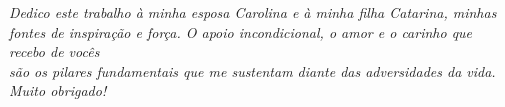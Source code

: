 \begin{dedicatoria}
    \vspace*{\fill}
    \centering
    \noindent
    \textit{ Dedico este trabalho à minha esposa Carolina e à minha filha Catarina, minhas \\
    fontes de inspiração e força. O apoio incondicional, o amor e o carinho que recebo de vocês \\ 
    são os pilares fundamentais que me sustentam diante das adversidades da vida.\\
    Muito obrigado!} \vspace*{\fill}

\end{dedicatoria}
